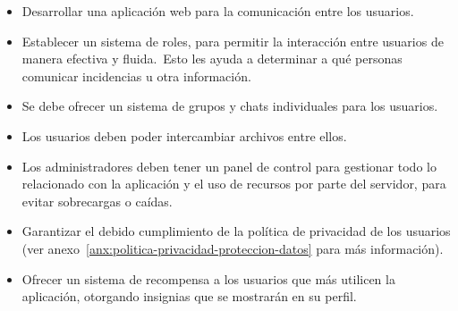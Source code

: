 \begin{itemize}
	\item Desarrollar una aplicación web para la comunicación entre los usuarios.
	\item Establecer un sistema de roles, para permitir la interacción entre usuarios de manera
	efectiva y fluida.\ Esto les ayuda a determinar a qué personas comunicar incidencias u otra
	información.
	\item Se debe ofrecer un sistema de grupos y chats individuales para los usuarios.
	\item Los usuarios deben poder intercambiar archivos entre ellos.
	\item Los administradores deben tener un panel de control para gestionar todo lo relacionado con la aplicación
	y el uso de recursos por parte del servidor, para evitar sobrecargas o caídas.
	\item Garantizar el debido cumplimiento de la política de privacidad de los usuarios
	(ver anexo~\ref{anx:politica-privacidad-proteccion-datos} para más información).
	\item Ofrecer un sistema de recompensa a los usuarios que más utilicen la aplicación, otorgando insignias
	que se mostrarán en su perfil.
\end{itemize}
\label{itm:alcance_objetivos}

